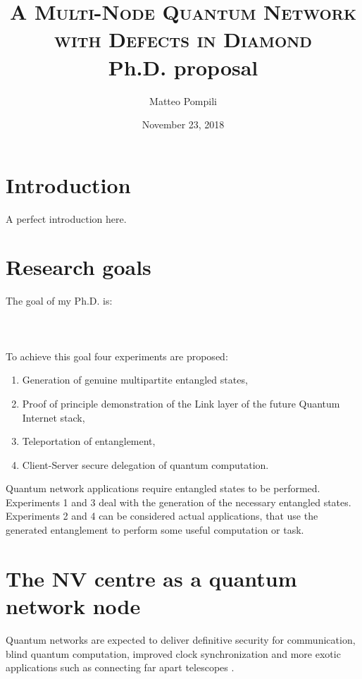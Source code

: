 \documentclass[a4paper]{article}
\title{
	\huge{\textsc{A Multi-Node Quantum Network\\with Defects in Diamond}}\\
	\vspace{10pt}\Large{Ph.D. proposal}
}
\author{Matteo Pompili}
\date{November 23, 2018}
\begin{document}
\maketitle

\section*{Introduction}
A perfect introduction here.
\blindtext[2]

\setcounter{secnumdepth}{1}
\setcounter{tocdepth}{1}
\tableofcontents

\newpage
\section{Research goals}
The goal of my Ph.D. is:\\\\
\\\\

To achieve this goal four experiments are proposed: 
\begin{enumerate}
	\item Generation of genuine multipartite entangled states,
	\item Proof of principle demonstration of the Link layer of the future Quantum Internet stack,
	\item Teleportation of entanglement,
	\item Client-Server secure delegation of quantum computation.
\end{enumerate}

Quantum network applications require entangled states to be performed. Experiments 1 and 3 deal with the generation of the necessary entangled states. Experiments 2 and 4 can be considered actual applications, that use the generated entanglement to perform some useful computation or task.


\section{The NV centre as a quantum network node}

Quantum networks are expected to deliver definitive security for communication, blind quantum computation, improved clock synchronization and more exotic applications such as connecting far apart telescopes \cite{Wehner2018}.
\end{document}
